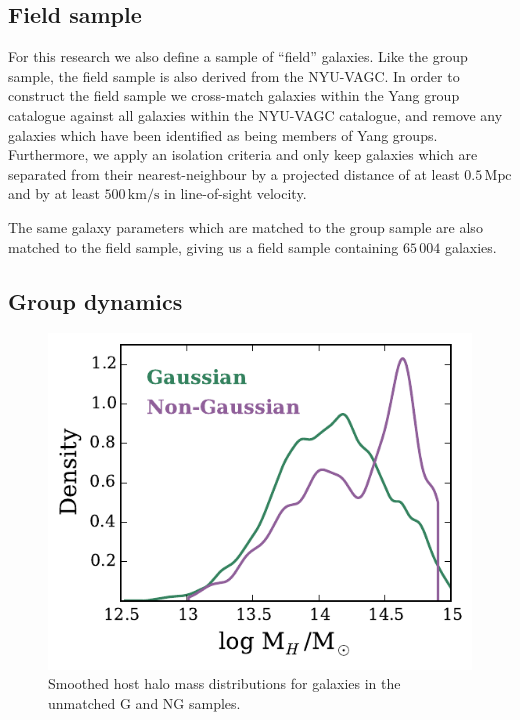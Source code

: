 \documentclass[a4paper,fleqn,usenatbib]{mnras}
\begin{document}
\subsection{Field sample}

For this research we also define a sample of ``field'' galaxies.  Like
the group sample, the field sample is also derived from the NYU-VAGC.
In order to construct the field sample we cross-match galaxies within
the Yang group catalogue against all galaxies within the NYU-VAGC
catalogue, and remove any galaxies which have been identified as being
members of Yang groups.  Furthermore, we apply an isolation
criteria and only keep galaxies which are separated from their
nearest-neighbour by a projected distance of at least
$0.5\,\mathrm{Mpc}$ and by at least $500\,\mathrm{km/s}$ in
line-of-sight velocity.
\par
The same galaxy parameters which are matched to the group sample are
also matched to the field sample, giving us a field sample containing
$65\,004$ galaxies.

\subsection{Group dynamics}

\begin{figure}
  \centering
  \includegraphics[width=\columnwidth]{mhdist_um.pdf}
  \caption{Smoothed host halo mass distributions for galaxies in the
    unmatched G and NG samples.}
  \label{fig:mhdist_um}
\end{figure}
\end{document}
